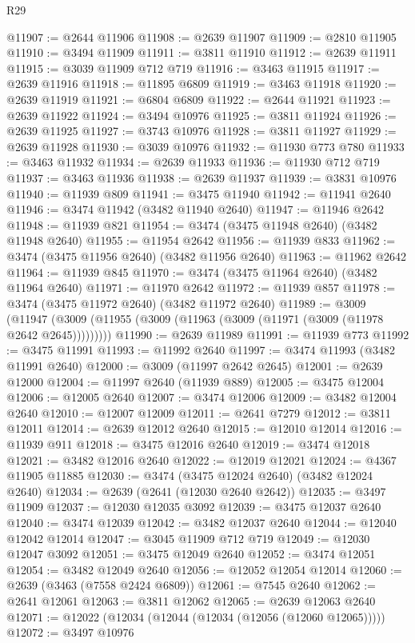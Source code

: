 \begin{lexlean}{R29}
\begin{coremodule}
@11907 := @2644 @11906
@11908 := @2639 @11907
@11909 := @2810 @11905
@11910 := @3494 @11909
@11911 := @3811 @11910
@11912 := @2639 @11911
@11915 := @3039 @11909 @712 @719
@11916 := @3463 @11915
@11917 := @2639 @11916
@11918 := @11895 @6809
@11919 := @3463 @11918
@11920 := @2639 @11919
@11921 := @6804 @6809
@11922 := @2644 @11921
@11923 := @2639 @11922
@11924 := @3494 @10976
@11925 := @3811 @11924
@11926 := @2639 @11925
@11927 := @3743 @10976
@11928 := @3811 @11927
@11929 := @2639 @11928
@11930 := @3039 @10976
@11932 := @11930 @773 @780
@11933 := @3463 @11932
@11934 := @2639 @11933
@11936 := @11930 @712 @719
@11937 := @3463 @11936
@11938 := @2639 @11937
@11939 := @3831 @10976
@11940 := @11939 @809
@11941 := @3475 @11940
@11942 := @11941 @2640
@11946 := @3474 @11942 (@3482 @11940 @2640)
@11947 := @11946 @2642
@11948 := @11939 @821
@11954 := @3474 (@3475 @11948 @2640) (@3482 @11948 @2640)
@11955 := @11954 @2642
@11956 := @11939 @833
@11962 := @3474 (@3475 @11956 @2640) (@3482 @11956 @2640)
@11963 := @11962 @2642
@11964 := @11939 @845
@11970 := @3474 (@3475 @11964 @2640) (@3482 @11964 @2640)
@11971 := @11970 @2642
@11972 := @11939 @857
@11978 := @3474 (@3475 @11972 @2640) (@3482 @11972 @2640)
@11989 := @3009
    (@11947 (@3009 (@11955 (@3009 (@11963 (@3009 (@11971 (@3009 (@11978 @2642 @2645)))))))))
@11990 := @2639 @11989
@11991 := @11939 @773
@11992 := @3475 @11991
@11993 := @11992 @2640
@11997 := @3474 @11993 (@3482 @11991 @2640)
@12000 := @3009 (@11997 @2642 @2645)
@12001 := @2639 @12000
@12004 := @11997 @2640 (@11939 @889)
@12005 := @3475 @12004
@12006 := @12005 @2640
@12007 := @3474 @12006
@12009 := @3482 @12004 @2640
@12010 := @12007 @12009
@12011 := @2641 @7279
@12012 := @3811 @12011
@12014 := @2639 @12012 @2640
@12015 := @12010 @12014
@12016 := @11939 @911
@12018 := @3475 @12016 @2640
@12019 := @3474 @12018
@12021 := @3482 @12016 @2640
@12022 := @12019 @12021
@12024 := @4367 @11905 @11885
@12030 := @3474 (@3475 @12024 @2640) (@3482 @12024 @2640)
@12034 := @2639 (@2641 (@12030 @2640 @2642))
@12035 := @3497 @11909
@12037 := @12030 @12035 @3092
@12039 := @3475 @12037 @2640
@12040 := @3474 @12039
@12042 := @3482 @12037 @2640
@12044 := @12040 @12042 @12014
@12047 := @3045 @11909 @712 @719
@12049 := @12030 @12047 @3092
@12051 := @3475 @12049 @2640
@12052 := @3474 @12051
@12054 := @3482 @12049 @2640
@12056 := @12052 @12054 @12014
@12060 := @2639 (@3463 (@7558 @2424 @6809))
@12061 := @7545 @2640
@12062 := @2641 @12061
@12063 := @3811 @12062
@12065 := @2639 @12063 @2640
@12071 := @12022 (@12034 (@12044 (@12034 (@12056 (@12060 @12065)))))
@12072 := @3497 @10976

\end{coremodule}
\end{lexlean}
